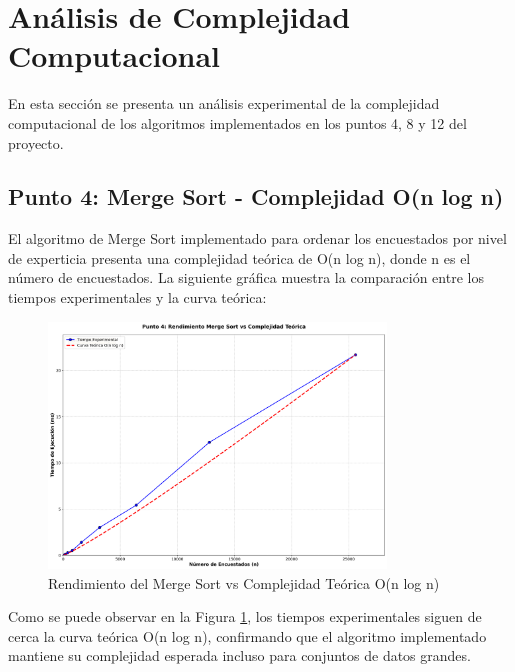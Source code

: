 

\section{Análisis de Complejidad Computacional}

En esta sección se presenta un análisis experimental de la complejidad computacional de los algoritmos implementados en los puntos 4, 8 y 12 del proyecto.

\subsection{Punto 4: Merge Sort - Complejidad O(n log n)}

El algoritmo de Merge Sort implementado para ordenar los encuestados por nivel de experticia presenta una complejidad teórica de O(n log n), donde n es el número de encuestados. La siguiente gráfica muestra la comparación entre los tiempos experimentales y la curva teórica:

\begin{figure}[h]
\centering
\includegraphics[width=0.8\textwidth]{grafica_punto4_mejorada.png}
\caption{Rendimiento del Merge Sort vs Complejidad Teórica O(n log n)}
\label{fig:merge_sort_analysis}
\end{figure}

Como se puede observar en la Figura \ref{fig:merge_sort_analysis}, los tiempos experimentales siguen de cerca la curva teórica O(n log n), confirmando que el algoritmo implementado mantiene su complejidad esperada incluso para conjuntos de datos grandes.

